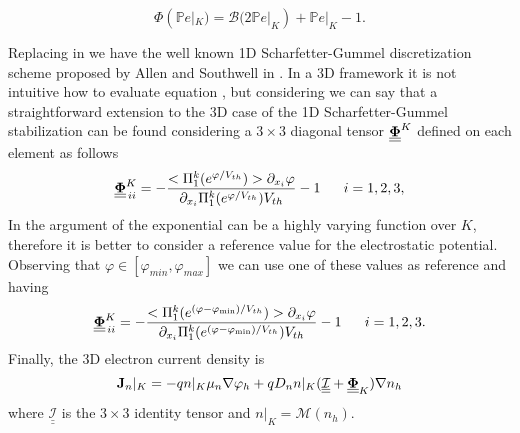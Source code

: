 \begin{equation}
\label{eq: SG stabilization function}
\Phi(\mathbb{P}e|_K) = \mathcal{B}(2\mathbb{P}e|_K) + \mathbb{P}e|_K -1.
\end{equation}


Replacing  in  we have the well known 1D Scharfetter-Gummel discretization scheme proposed by Allen and Southwell in \cite{Allen:SGformula}.
In a 3D framework it is not intuitive how to evaluate equation , but considering   we can say that a straightforward extension to the 3D case of the 1D Scharfetter-Gummel stabilization can be found considering a $3\times 3$ diagonal tensor  $\underline{\underline{\mathbf{\Phi}}}^K$  defined on each element as follows
\vspace{0.2cm}
\begin{equation}
\label{eq: SG stabilized}
\underline{\underline{\vect{\Phi}}}^K_{\, ii} = -\dfrac{<\Pi_1^k(e^{\varphi/V_{th}})> \partial_{x_i}\varphi}{\partial_{x_i}\Pi_1^k(e^{\varphi/V_{th}})V_{th}} -1 \psp{10} i = 1,2,3,
\end{equation}
\vspace{0.2cm}
In  the argument of the exponential can be a highly varying function over $K$, therefore it is better to consider a reference value for the electrostatic potential.
 Observing that $\varphi \in [\varphi_{min},\varphi_{max}]$ we can use one of these values as reference and having
 \vspace{0.2cm}
 \begin{equation}
\label{eq: SG stabilized}
\underline{\underline{\vect{\Phi}}}^K_{\, ii}  = -\dfrac{<\Pi_1^k(e^{(\varphi-\varphi_{\min})/V_{th}})> \partial_{x_i}\varphi}{\partial_{x_i}\Pi_1^k(e^{(\varphi-\varphi_{\min})/V_{th}})V_{th}} -1 \psp{10} i = 1,2,3.
\end{equation}
\vspace{0.2cm}
Finally, the 3D electron current density is
\vspace{0.2cm}
\begin{equation}
\label{eq: Jn 3D upwin SG}
\mathbf{J}_n|_K = -qn|_K\mu_n\nabla \varphi_h + qD_nn|_K(\underline{\underline{\mathcal{I}}}+\underline{\underline{\mathbf{\Phi}}}_K) \nabla n_h
\end{equation}
\vspace{0.2cm}
where $\underline{\underline{\mathcal{I}}}$ is the $3\times 3$ identity tensor and $n|_K=\mathcal{M}(n_h)$.

